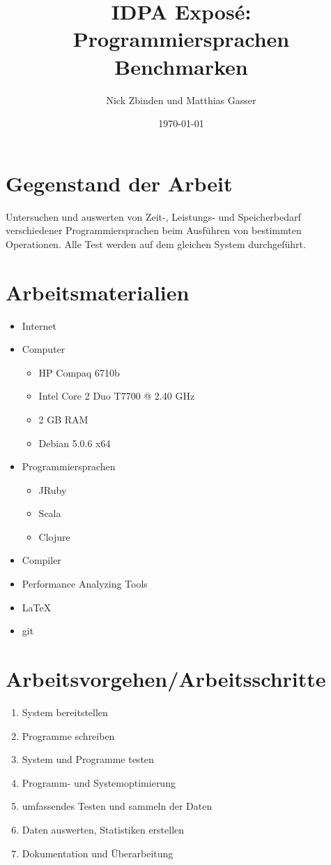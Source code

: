 \documentclass{fancydocument}
\title{IDPA Exposé: Programmiersprachen Benchmarken}
\author{Nick Zbinden und Matthias Gasser}
\date{\today}
\begin{document}
\maketitle
\thispagestyle{fancy}

\section*{Gegenstand der Arbeit}
Untersuchen und auswerten von Zeit-, Leistungs- und Speicherbedarf
verschiedener Programmiersprachen beim Ausführen von bestimmten
Operationen. 
Alle Test werden auf dem gleichen System durchgeführt. 

\section*{Arbeitsmaterialien}
\begin{itemize}
	\item Internet
	\item Computer
	\begin{itemize}
		\item HP Compaq 6710b
		\item Intel Core 2 Duo T7700 @ 2.40 GHz
		\item 2 GB RAM
		\item Debian 5.0.6 x64
	\end{itemize}
	\item Programmiersprachen
	\begin{itemize}
		\item JRuby
		\item Scala
		\item Clojure
	\end{itemize}
	\item Compiler
	\item Performance Analyzing Tools
	\item LaTeX
	\item git
\end{itemize}

\section*{Arbeitsvorgehen/Arbeitsschritte}
\begin{enumerate}
	\item System bereitstellen
	\item Programme schreiben
	\item System und Programme testen
	\item Programm- und Systemoptimierung
	\item umfassendes Testen und sammeln der Daten
	\item Daten auswerten, Statistiken erstellen
	\item Dokumentation und Überarbeitung
\end{enumerate}
\end{document}
